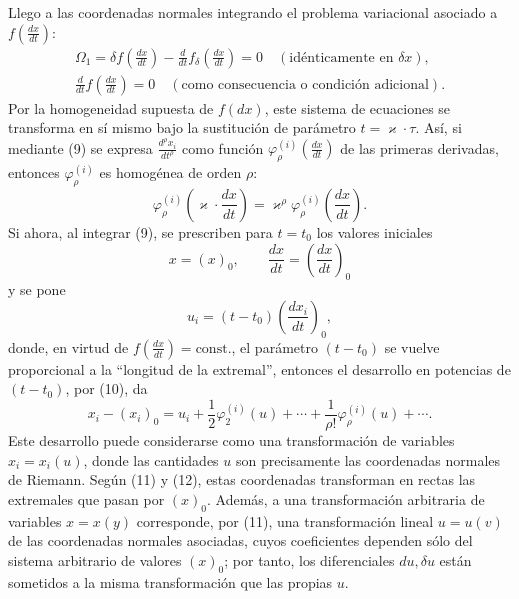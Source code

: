 \documentclass[11pt]{article}
\begin{document}
Llego a las coordenadas normales integrando el problema variacional asociado a
\(f\!\left(\frac{dx}{dt}\right)\):
\begin{equation}
\begin{gathered}
\Omega_1=\delta f\!\left(\frac{dx}{dt}\right)
-\frac{d}{dt}f_\delta\!\left(\frac{dx}{dt}\right)=0
\quad(\text{idénticamente en }\delta x),\\
\frac{d}{dt}f\!\left(\frac{dx}{dt}\right)=0
\quad(\text{como consecuencia o condición adicional}).
\end{gathered}
\tag{9}
\end{equation}
Por la homogeneidad supuesta de \(f(dx)\), este sistema de ecuaciones se
transforma en sí mismo bajo la sustitución de parámetro \(t=\varkappa\cdot\tau\).
Así, si mediante (9) se expresa \(\frac{d^\rho x_i}{dt^\rho}\) como función
\(\varphi_\rho^{(i)}\!\left(\frac{dx}{dt}\right)\) de las primeras derivadas,
entonces \(\varphi_\rho^{(i)}\) es homogénea de orden \(\rho\):
\begin{equation}
\varphi_\rho^{(i)}\!\left(\varkappa\cdot\frac{dx}{dt}\right)
=\varkappa^\rho\varphi_\rho^{(i)}\!\left(\frac{dx}{dt}\right).
\tag{10}
\end{equation}
Si ahora, al integrar (9), se prescriben para \(t=t_0\) los valores iniciales
\[
x=(x)_0,\qquad \frac{dx}{dt}=\left(\frac{dx}{dt}\right)_0
\]
y se pone
\begin{equation}
u_i=(t-t_0)\left(\frac{dx_i}{dt}\right)_0,
\tag{11}
\end{equation}
donde, en virtud de \(f\!\left(\frac{dx}{dt}\right)=\mathrm{const.}\), el
parámetro \((t-t_0)\) se vuelve proporcional a la ``longitud de la extremal'',
entonces el desarrollo en potencias de \((t-t_0)\), por (10), da
\begin{equation}
x_i-(x_i)_0=u_i+\frac12\varphi_2^{(i)}(u)+\cdots+
\frac{1}{\rho!}\varphi_\rho^{(i)}(u)+\cdots .
\tag{12}
\end{equation}
Este desarrollo puede considerarse como una transformación de variables
\(x_i=x_i(u)\), donde las cantidades \(u\) son precisamente las coordenadas
normales de Riemann. Según (11) y (12), estas coordenadas transforman en rectas
las extremales que pasan por \((x)_0\). Además, a una transformación arbitraria
de variables \(x=x(y)\) corresponde, por (11), una transformación lineal
\(u=u(v)\) de las coordenadas normales asociadas, cuyos coeficientes dependen
sólo del sistema arbitrario de valores \((x)_0\); por tanto, los diferenciales
\(du,\delta u\) están sometidos a la misma transformación que las propias
\(u\).
\end{document}
